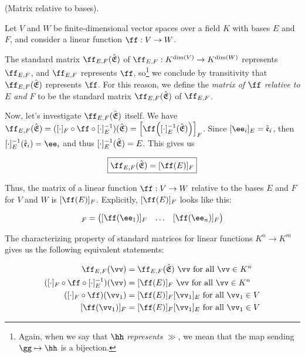 \begin{deriv}
\label{ch::lin_alg::deriv::matrix_relative_to_bases}
    (Matrix relative to bases).
    
    Let $V$ and $W$ be finite-dimensional vector spaces over a field $K$ with bases $E$ and $F$, and consider a linear function $\ff:V \rightarrow W$. 
    
    The standard matrix $\ff_{E,F}(\sE)$ of $\ff_{E,F}:K^{\dim(V)} \rightarrow K^{\dim(W)}$ represents $\ff_{E,F}$, and $\ff_{E,F}$ represents $\ff$, so\footnote{Again, when we say that $\hh$ \textit{represents} $\gg$, we mean that the map sending $\gg \mapsto \hh$ is a bijection.} we conclude by transitivity that $\ff_{E,F}(\sE)$ represents $\ff$. For this reason, we define the \textit{matrix of $\ff$ relative to $E$ and $F$} to be the standard matrix $\ff_{E,F}(\sE)$ of $\ff_{E,F}$.
    
    Now, let's investigate $\ff_{E,F}(\sE)$ itself. We have $\ff_{E,F}(\sE) = ([\cdot]_F \circ \ff \circ [\cdot]_E^{-1})(\sE) = \Big[\ff\Big([\cdot]_E^{-1}(\sE)\Big)\Big]_F$. Since $[\ee_i]_E = \see_i$, then $[\cdot]_E^{-1}(\see_i) = \ee_i$ and thus $[\cdot]_E^{-1}({\hat{\mathfrak{E}}}) = E$. This gives us 
    
    \begin{align*}
        \boxed
        {
            \ff_{E,F}(\sE) = [\ff(E)]_F
        }
    \end{align*}
    
    Thus, the matrix of a linear function $\ff:V \rightarrow W$ relative to the bases $E$ and $F$ for $V$ and $W$ is $[\ff(E)]_F$. Explicitly, $[\ff(E)]_F$ looks like this:
    
    \begin{align*}
        [\ff(E)]_F =
        \begin{pmatrix}
            [\ff(\ee_1)]_F & \hdots & [\ff(\ee_n)]_F
        \end{pmatrix}
    \end{align*}
    
    The characterizing property of standard matrices for linear functions $K^n \rightarrow K^m$ gives us the following equivalent statements:
    
    \begin{align*}
        \ff_{E,F}(\vv) &= \ff_{E,F}(\sE) \spc \vv \text{ for all $\vv \in K^n$} \\
        ([\cdot]_F \circ \ff \circ [\cdot]_E^{-1})(\vv) &= [\ff(E)]_F \spc \vv \text{ for all $\vv \in K^n$} \\
        ([\cdot]_F \circ \ff)(\vv_1) &= [\ff(E)]_F [\vv_1]_E \text{ for all $\vv_1 \in V$} \\
        [\ff(\vv_1)]_F &= [\ff(E)]_F [\vv_1]_E \text{ for all $\vv_1 \in V$}
    \end{align*}
    

\end{deriv}
